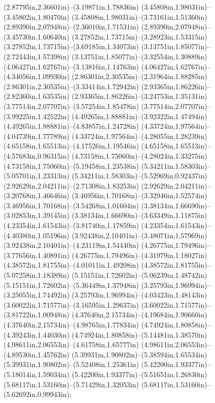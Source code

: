 (2.87795in,2.36601in)--(3.19871in,1.78836in) (3.45808in,1.98031in)--(3.45802in,1.80470in) (3.45808in,1.98031in)--(3.73161in,1.51360in) (2.89390in,2.07948in)--(2.36010in,1.71531in) (2.89390in,2.07948in)--(3.45730in,1.60640in) (3.27852in,1.73715in)--(3.28923in,1.53315in) (3.27852in,1.73715in)--(3.69185in,1.34073in) (3.13751in,1.85077in)--(2.72443in,1.57398in) (3.13751in,1.85077in)--(3.32554in,1.30889in) (4.06427in,1.62767in)--(3.13816in,1.14763in) (4.06427in,1.62767in)--(4.34056in,1.09930in) (2.86301in,2.30535in)--(2.31964in,1.88285in) (2.86301in,2.30535in)--(3.33414in,1.72942in) (2.93365in,1.86226in)--(2.82360in,1.63535in) (2.93365in,1.86226in)--(3.24753in,1.35131in) (3.77514in,2.07707in)--(3.57254in,1.85478in) (3.77514in,2.07707in)--(3.99225in,1.42522in) (4.49265in,1.88881in)--(3.92322in,1.47494in) (4.49265in,1.88881in)--(4.83857in,1.24728in) (4.33724in,1.97564in)--(4.04739in,1.77789in) (4.33724in,1.97564in)--(4.28055in,1.28239in) (4.65158in,1.65513in)--(4.17526in,1.19546in) (4.65158in,1.65513in)--(4.57683in,0.96315in) (4.73158in,1.75060in)--(4.28024in,1.33275in) (4.73158in,1.75060in)--(5.19458in,1.23538in) (5.34211in,1.58303in)--(5.05701in,1.23313in) (5.34211in,1.58303in)--(5.52969in,0.92437in) (2.92629in,2.04211in)--(2.71308in,1.83253in) (2.92629in,2.04211in)--(3.20768in,1.46646in) (3.46956in,1.70168in)--(3.32946in,1.52574in) (3.46956in,1.70168in)--(3.54268in,1.01604in) (3.38134in,1.66690in)--(3.02853in,1.39145in) (3.38134in,1.66690in)--(3.63349in,1.11875in) (4.23354in,1.61543in)--(3.81740in,1.17859in) (4.23354in,1.61543in)--(4.40380in,1.05196in) (3.92438in,2.10401in)--(3.48071in,1.57969in) (3.92438in,2.10401in)--(4.23119in,1.54440in) (4.26775in,1.79496in)--(3.77656in,1.40891in) (4.26775in,1.79496in)--(4.31979in,1.18027in) (4.38572in,1.81755in)--(4.01011in,1.49208in) (4.38572in,1.81755in)--(5.07258in,1.18389in) (5.15151in,1.72602in)--(5.06239in,1.48742in) (5.15151in,1.72602in)--(5.36449in,1.37948in) (3.25793in,1.96994in)--(3.25055in,1.74492in) (3.25793in,1.96994in)--(4.03423in,1.48143in) (3.60022in,1.71577in)--(3.16595in,1.29637in) (3.60022in,1.71577in)--(3.81722in,1.00948in) (4.37640in,2.15734in)--(4.19684in,1.90660in) (4.37640in,2.15734in)--(4.98765in,1.77834in) (4.74924in,1.80858in)--(4.39243in,1.44030in) (4.74924in,1.80858in)--(5.14481in,1.38570in) (4.98611in,2.06553in)--(4.61758in,1.65777in) (4.98611in,2.06553in)--(4.89530in,1.45762in) (5.39931in,1.90802in)--(5.38594in,1.65534in) (5.39931in,1.90802in)--(5.52408in,1.25361in) (5.42200in,1.93377in)--(5.18014in,1.59034in) (5.42200in,1.93377in)--(5.51651in,1.26830in) (5.68117in,1.53160in)--(5.71429in,1.32053in) (5.68117in,1.53160in)--(5.62692in,0.99943in);
